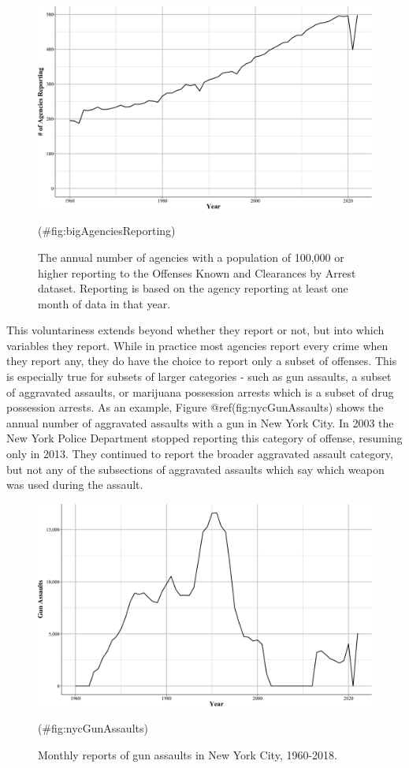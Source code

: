 \documentclass[
  12pt,
  openany]{book}
\begin{document}
\begin{figure}

{\centering \includegraphics[width=0.9\linewidth]{ucrbook_files/figure-latex/bigAgenciesReporting-1} 

}

\caption{The annual number of agencies with a population of 100,000 or higher reporting to the Offenses Known and Clearances by Arrest dataset. Reporting is based on the agency reporting at least one month of data in that year.}(\#fig:bigAgenciesReporting)
\end{figure}

This voluntariness extends beyond whether they report or not, but into which variables they report. While in practice most agencies report every crime when they report any, they do have the choice to report only a subset of offenses. This is especially true for subsets of larger categories - such as gun assaults, a subset of aggravated assaults, or marijuana possession arrests which is a subset of drug possession arrests. As an example, Figure @ref(fig:nycGunAssaults) shows the annual number of aggravated assaults with a gun in New York City. In 2003 the New York Police Department stopped reporting this category of offense, resuming only in 2013. They continued to report the broader aggravated assault category, but not any of the subsections of aggravated assaults which say which weapon was used during the assault.

\begin{figure}

{\centering \includegraphics[width=0.9\linewidth]{ucrbook_files/figure-latex/nycGunAssaults-1} 

}

\caption{Monthly reports of gun assaults in New York City, 1960-2018.}(\#fig:nycGunAssaults)
\end{figure}
\end{document}

